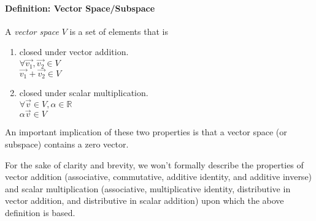 \paragraph{Definition: Vector Space/Subspace}

A \textit{vector space} $V$ is a set of elements that is
\begin{enumerate}
	\item closed under vector addition.\\
		$\forall \vec{v_1}, \vec{v_2} \in V$\\
		$\vec{v_1} + \vec{v_2} \in V$
	\item closed under scalar multiplication.\\
		$\forall \vec{v} \in V, \alpha\in\mathbb{R}$\\
		$\alpha\vec{v} \in V$
\end{enumerate}

An important implication of these two properties is that a vector space (or subspace) contains a zero vector.

For the sake of clarity and brevity, we won't formally describe the properties of vector addition (associative, commutative, additive identity, and additive inverse) and scalar multiplication (associative, multiplicative identity, distributive in vector addition, and distributive in scalar addition) upon which the above definition is based.

